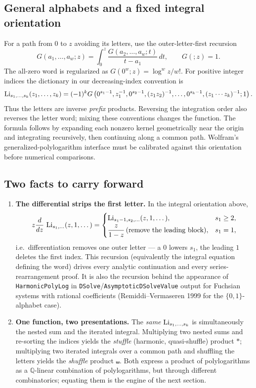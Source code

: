 \subsection{General alphabets and a fixed integral orientation}
For a path from $0$ to $z$ avoiding its letters, use the outer-letter-first
recursion
\[
G(a_1,\ldots,a_w;z)=\int_0^z\frac{G(a_2,\ldots,a_w;t)}{t-a_1}\,dt,
\qquad G(;z)=1.
\]
The all-zero word is regularized as $G(0^w;z)=\log^w z/w!$.
For positive integer indices the dictionary in our decreasing-index
convention is
\[
\operatorname{Li}_{s_1,\ldots,s_k}(z_1,\ldots,z_k)
=(-1)^kG\left(0^{s_1-1},z_1^{-1},
 0^{s_2-1},(z_1z_2)^{-1},\ldots,
 0^{s_k-1},(z_1\cdots z_k)^{-1};1\right).
\]
Thus the letters are inverse \emph{prefix} products. Reversing the
integration order also reverses the letter word; mixing these conventions
changes the function. The formula follows by expanding each nonzero kernel
geometrically near the origin and integrating recursively, then continuing
along a common path. Wolfram's generalized-polylogarithm interface must be
calibrated against this orientation before numerical comparisons.

\subsection{Two facts to carry forward}

\begin{enumerate}
\item[(1)] \textbf{The differential strips the first letter.} In the integral orientation above,
\[
  z\frac{d}{dz}\,\operatorname{Li}_{s_1,\dots}(z,1,\dots)=\begin{cases}\operatorname{Li}_{s_1-1,s_2,\dots}(z,1,\dots),& s_1\ge2,\\[2pt]
  \dfrac{z}{1-z}\,\text{(remove the leading block)},& s_1=1,\end{cases}
\]
i.e.\ differentiation removes one outer letter --- a $0$ lowers $s_1$, the leading $1$ deletes the first index. This recursion (equivalently the integral equation defining the word) drives every analytic continuation and every series-rearrangement proof. It is also the recursion behind the appearance of \texttt{HarmonicPolyLog} in \texttt{DSolve}/\texttt{AsymptoticDSolveValue} output for Fuchsian systems with rational coefficients (Remiddi--Vermaseren 1999 for the $\{0,1\}$-alphabet case).
\item[(2)] \textbf{One function, two presentations.} The \emph{same} $\operatorname{Li}_{s_1,\dots,s_k}$ is simultaneously the nested sum and the iterated integral. Multiplying two nested sums and re-sorting the indices yields the \emph{stuffle} (harmonic, quasi-shuffle) product $\ast$; multiplying two iterated integrals over a common path and shuffling the letters yields the \emph{shuffle} product $\shuffle$. Both express a product of polylogarithms as a $\mathbb{Q}$-linear combination of polylogarithms, but through different combinatorics; equating them is the engine of the next section.
\end{enumerate}

